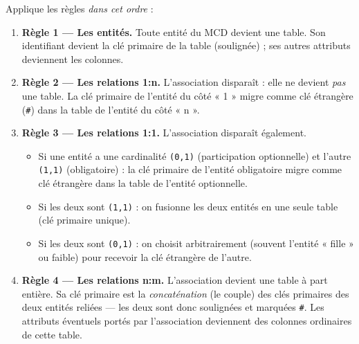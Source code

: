 \documentclass[11pt]{article}
\begin{document}
\begin{methode}
Applique les règles \emph{dans cet ordre} :
\begin{enumerate}
\item \textbf{Règle 1 --- Les entités.} Toute entité du MCD devient une table. Son identifiant devient la clé primaire de la table (soulignée) ; ses autres attributs deviennent les colonnes.
\item \textbf{Règle 2 --- Les relations 1:n.} L'association disparaît : elle ne devient \emph{pas} une table. La clé primaire de l'entité du côté « 1 » migre comme clé étrangère (\texttt{\#}) dans la table de l'entité du côté « n ».
\item \textbf{Règle 3 --- Les relations 1:1.} L'association disparaît également.
\begin{itemize}
\item Si une entité a une cardinalité \texttt{(0,1)} (participation optionnelle) et l'autre \texttt{(1,1)} (obligatoire) : la clé primaire de l'entité obligatoire migre comme clé étrangère dans la table de l'entité optionnelle.
\item Si les deux sont \texttt{(1,1)} : on fusionne les deux entités en une seule table (clé primaire unique).
\item Si les deux sont \texttt{(0,1)} : on choisit arbitrairement (souvent l'entité « fille » ou faible) pour recevoir la clé étrangère de l'autre.
\end{itemize}
\item \textbf{Règle 4 --- Les relations n:m.} L'association devient une table à part entière. Sa clé primaire est la \emph{concaténation} (le couple) des clés primaires des deux entités reliées --- les deux sont donc soulignées et marquées \texttt{\#}. Les attributs éventuels portés par l'association deviennent des colonnes ordinaires de cette table.
\end{enumerate}
\end{methode}
\end{document}
